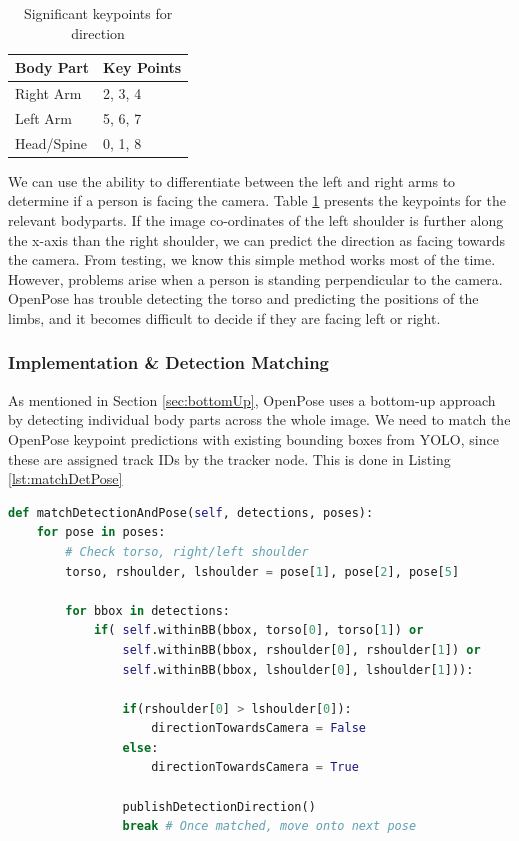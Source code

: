\begin{table}[ht]
	\centering
	\begin{tabular}{|l|l|}
		\hline
		Body Part  & Key Points \\ \hline
		Right Arm  & 2, 3, 4    \\ \hline
		Left Arm   & 5, 6, 7    \\ \hline
		Head/Spine & 0, 1, 8    \\ \hline
	\end{tabular}
	\caption{Significant keypoints for direction}
	\label{tab:keypoints}
\end{table}

We can use the ability to differentiate between the left and right arms to determine if a person is facing the camera. Table \ref{tab:keypoints} presents the keypoints for the relevant bodyparts. If the image co-ordinates of the left shoulder is further along the x-axis than the right shoulder, we can predict the direction as facing towards the camera. From testing, we know this simple method works most of the time. However, problems arise when a person is standing perpendicular to the camera. OpenPose has trouble detecting the torso and predicting the positions of the limbs, and it becomes difficult to decide if they are facing left or right.

\subsubsection{Implementation \& Detection Matching}
As mentioned in Section \ref{sec:bottomUp}, OpenPose uses a bottom-up approach by detecting individual body parts across the whole image. We need to match the OpenPose keypoint predictions with existing bounding boxes from YOLO, since these are assigned track IDs by the tracker node. This is done in Listing \ref{lst:matchDetPose} \\

\begin{lstlisting}[language=Python, caption={Direction and Detection Matching}, label={lst:matchDetPose}]
def matchDetectionAndPose(self, detections, poses):
    for pose in poses:
        # Check torso, right/left shoulder
        torso, rshoulder, lshoulder = pose[1], pose[2], pose[5]

        for bbox in detections:
            if( self.withinBB(bbox, torso[0], torso[1]) or
                self.withinBB(bbox, rshoulder[0], rshoulder[1]) or
                self.withinBB(bbox, lshoulder[0], lshoulder[1])):
   
                if(rshoulder[0] > lshoulder[0]):
                    directionTowardsCamera = False
                else:
                    directionTowardsCamera = True

                publishDetectionDirection() 
                break # Once matched, move onto next pose 
\end{lstlisting}

